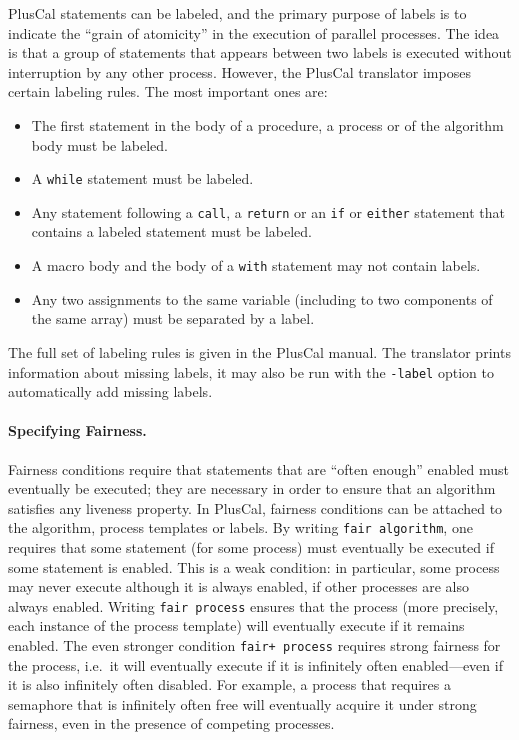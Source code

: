 \documentclass[11pt,fleqn]{article}
\begin{document}
PlusCal statements can be labeled, and the primary purpose of labels is to
indicate the ``grain of atomicity'' in the execution of parallel processes. The
idea is that a group of statements that appears between two labels is executed
without interruption by any other process. However, the PlusCal translator
imposes certain labeling rules. The most important ones are:
\begin{itemize}
\item The first statement in the body of a procedure, a process or of the
  algorithm body must be labeled.
\item A \verb|while| statement must be labeled.
\item Any statement following a \verb|call|, a \verb|return| or an \verb|if| or
  \verb|either| statement that contains a labeled statement must be labeled.
\item A macro body and the body of a \verb|with| statement may not contain
  labels.
\item Any two assignments to the same variable (including to two components of
  the same array) must be separated by a label.
\end{itemize}
The full set of labeling rules is given in the PlusCal manual. The translator
prints information about missing labels, it may also be run with the
\verb|-label| option to automatically add missing labels.

\paragraph{Specifying Fairness.}

Fairness conditions require that statements that are ``often enough'' enabled
must eventually be executed; they are necessary in order to ensure that an
algorithm satisfies any liveness property. In PlusCal, fairness conditions can
be attached to the algorithm, process templates or labels. By writing
\verb|fair algorithm|, one requires that some statement (for some process) must
eventually be executed if some statement is enabled. This is a weak condition:
in particular, some process may never execute although it is always enabled, if
other processes are also always enabled. Writing \verb|fair process| ensures
that the process (more precisely, each instance of the process template) will
eventually execute if it remains enabled. The even stronger condition
\verb|fair+ process| requires strong fairness for the process, i.e.\ it will
eventually execute if it is infinitely often enabled---even if it is also
infinitely often disabled. For example, a process that requires a semaphore that
is infinitely often free will eventually acquire it under strong fairness, even
in the presence of competing processes.
\end{document}
